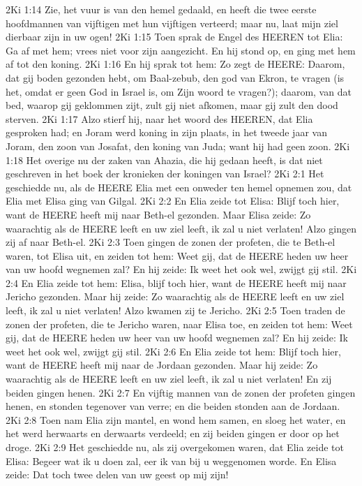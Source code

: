 2Ki 1:14  Zie, het vuur is van den hemel gedaald, en heeft die twee eerste hoofdmannen van vijftigen met hun vijftigen verteerd; maar nu, laat mijn ziel dierbaar zijn in uw ogen!
2Ki 1:15  Toen sprak de Engel des HEEREN tot Elia: Ga af met hem; vrees niet voor zijn aangezicht. En hij stond op, en ging met hem af tot den koning.
2Ki 1:16  En hij sprak tot hem: Zo zegt de HEERE: Daarom, dat gij boden gezonden hebt, om Baal-zebub, den god van Ekron, te vragen (is het, omdat er geen God in Israel is, om Zijn woord te vragen?); daarom, van dat bed, waarop gij geklommen zijt, zult gij niet afkomen, maar gij zult den dood sterven.
2Ki 1:17  Alzo stierf hij, naar het woord des HEEREN, dat Elia gesproken had; en Joram werd koning in zijn plaats, in het tweede jaar van Joram, den zoon van Josafat, den koning van Juda; want hij had geen zoon.
2Ki 1:18  Het overige nu der zaken van Ahazia, die hij gedaan heeft, is dat niet geschreven in het boek der kronieken der koningen van Israel?
2Ki 2:1  Het geschiedde nu, als de HEERE Elia met een onweder ten hemel opnemen zou, dat Elia met Elisa ging van Gilgal.
2Ki 2:2  En Elia zeide tot Elisa: Blijf toch hier, want de HEERE heeft mij naar Beth-el gezonden. Maar Elisa zeide: Zo waarachtig als de HEERE leeft en uw ziel leeft, ik zal u niet verlaten! Alzo gingen zij af naar Beth-el.
2Ki 2:3  Toen gingen de zonen der profeten, die te Beth-el waren, tot Elisa uit, en zeiden tot hem: Weet gij, dat de HEERE heden uw heer van uw hoofd wegnemen zal? En hij zeide: Ik weet het ook wel, zwijgt gij stil.
2Ki 2:4  En Elia zeide tot hem: Elisa, blijf toch hier, want de HEERE heeft mij naar Jericho gezonden. Maar hij zeide: Zo waarachtig als de HEERE leeft en uw ziel leeft, ik zal u niet verlaten! Alzo kwamen zij te Jericho.
2Ki 2:5  Toen traden de zonen der profeten, die te Jericho waren, naar Elisa toe, en zeiden tot hem: Weet gij, dat de HEERE heden uw heer van uw hoofd wegnemen zal? En hij zeide: Ik weet het ook wel, zwijgt gij stil.
2Ki 2:6  En Elia zeide tot hem: Blijf toch hier, want de HEERE heeft mij naar de Jordaan gezonden. Maar hij zeide: Zo waarachtig als de HEERE leeft en uw ziel leeft, ik zal u niet verlaten! En zij beiden gingen henen.
2Ki 2:7  En vijftig mannen van de zonen der profeten gingen henen, en stonden tegenover van verre; en die beiden stonden aan de Jordaan.
2Ki 2:8  Toen nam Elia zijn mantel, en wond hem samen, en sloeg het water, en het werd herwaarts en derwaarts verdeeld; en zij beiden gingen er door op het droge.
2Ki 2:9  Het geschiedde nu, als zij overgekomen waren, dat Elia zeide tot Elisa: Begeer wat ik u doen zal, eer ik van bij u weggenomen worde. En Elisa zeide: Dat toch twee delen van uw geest op mij zijn!
